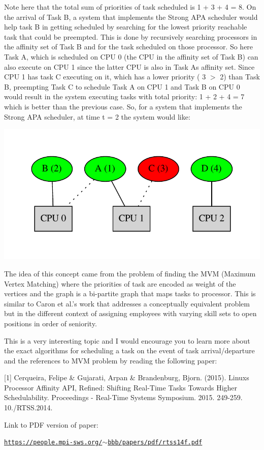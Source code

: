 Note here that the total sum of priorities of task scheduled is 1 + 3 + 4 = 8. On the arrival of Task B, a system that implements the Strong A\+PA scheduler would help task B in getting scheduled by searching for the lowest priority reachable task that could be preempted. This is done by recursively searching processors in the affinity set of Task B and for the task scheduled on those processor. So here Task A, which is scheduled on C\+PU 0 (the C\+PU in the affinity set of Task B) can also execute on C\+PU 1 since the latter C\+PU is also in Task A\textquotesingle{}s affinity set. Since C\+PU 1 has task C executing on it, which has a lower priority ( 3 $>$ 2) than Task B, preempting Task C to schedule Task A on C\+PU 1 and Task B on C\+PU 0 would result in the system executing tasks with total priority\+: 1 + 2 + 4 = 7 which is better than the previous case. So, for a system that implements the Strong A\+PA scheduler, at time t = 2 the system would like\+:


\begin{DoxyImageNoCaption}
  \mbox{\includegraphics[width=\textwidth,height=\textheight/2,keepaspectratio=true]{dot_inline_dotgraph_4}}
\end{DoxyImageNoCaption}


The idea of this concept came from the problem of finding the M\+VM (Maximum Vertex Matching) where the priorities of task are encoded as weight of the vertices and the graph is a bi-\/partite graph that maps tasks to processor. This is similar to Caron et al.\+’s work that addresses a conceptually equivalent problem but in the different context of assigning employees with varying skill sets to open positions in order of seniority.

This is a very interesting topic and I would encourage you to learn more about the exact algorithms for scheduling a task on the event of task arrival/departure and the references to M\+VM problem by reading the following paper\+:

\mbox{[}1\mbox{]} Cerqueira, Felipe \& Gujarati, Arpan \& Brandenburg, Bjorn. (2015). Linux\textquotesingle{}s Processor Affinity A\+PI, Refined\+: Shifting Real-\/\+Time Tasks Towards Higher Schedulability. Proceedings -\/ Real-\/\+Time Systems Symposium. 2015. 249-\/259. 10./\+R\+T\+SS.2014.

Link to P\+DF version of paper\+:

\href{https://people.mpi-sws.org/~bbb/papers/pdf/rtss14f.pdf}{\tt https\+://people.\+mpi-\/sws.\+org/$\sim$bbb/papers/pdf/rtss14f.\+pdf} 